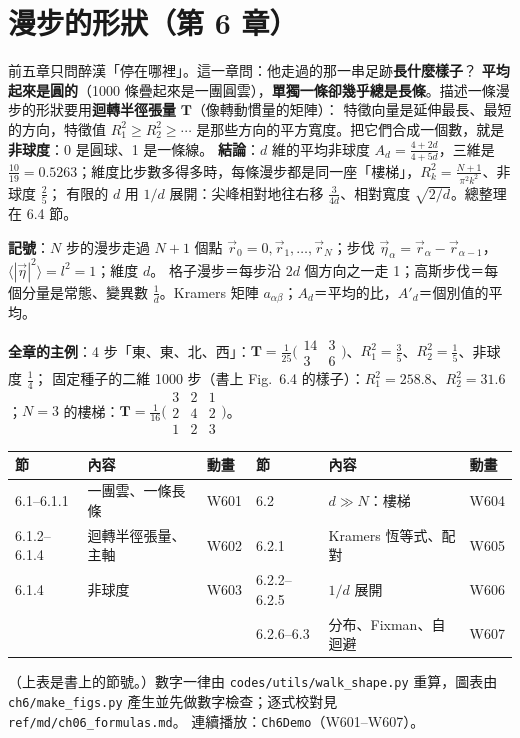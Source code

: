 

\section{漫步的形狀（第 6 章）}

\begin{keybox}[先看這裡]
前五章只問醉漢「停在哪裡」。這一章問：他走過的那一串足跡\textbf{長什麼樣子}？
\textbf{平均起來是圓的}（1000 條疊起來是一團圓雲），\textbf{單獨一條卻幾乎總是長條}。描述一條漫步的形狀要用\textbf{迴轉半徑張量} $\mathbf T$（像轉動慣量的矩陣）：
特徵向量是延伸最長、最短的方向，特徵值 $R_1^2\ge R_2^2\ge\cdots$ 是那些方向的平方寬度。把它們合成一個數，就是\textbf{非球度}：0 是圓球、1 是一條線。
\textbf{結論}：$d$ 維的平均非球度 $A_d=\frac{4+2d}{4+5d}$，三維是 $\frac{10}{19}=0.5263$；維度比步數多得多時，每條漫步都是同一座「樓梯」，$R_k^2=\frac{N+1}{\pi^2k^2}$、非球度 $\frac25$；
有限的 $d$ 用 $1/d$ 展開：尖峰相對地往右移 $\frac{3}{4d}$、相對寬度 $\sqrt{2/d}$。總整理在 6.4 節。

\textbf{記號}：$N$ 步的漫步走過 $N+1$ 個點 $\vec r_0=0,\vec r_1,\dots,\vec r_N$；步伐 $\vec\eta_\alpha=\vec r_\alpha-\vec r_{\alpha-1}$，$\langle|\vec\eta|^2\rangle=l^2=1$；維度 $d$。
格子漫步＝每步沿 $2d$ 個方向之一走 1；高斯步伐＝每個分量是常態、變異數 $\frac1d$。Kramers 矩陣 $a_{\alpha\beta}$；$A_d$＝平均的比，$A'_d$＝個別值的平均。

\textbf{全章的主例}：4 步「東、東、北、西」：$\mathbf T=\frac1{25}\big(\begin{smallmatrix}14&3\\3&6\end{smallmatrix}\big)$、$R_1^2=\frac35$、$R_2^2=\frac15$、非球度 $\frac14$；
固定種子的二維 1000 步（書上 Fig.~6.4 的樣子）：$R_1^2=258.8$、$R_2^2=31.6$；$N=3$ 的樓梯：$\mathbf T=\frac1{16}\big(\begin{smallmatrix}3&2&1\\2&4&2\\1&2&3\end{smallmatrix}\big)$。
\begin{center}
\small
\begin{tabular}{@{}lll@{\qquad}lll@{}}
\toprule
節 & 內容 & 動畫 & 節 & 內容 & 動畫\\
\midrule
6.1--6.1.1 & 一團雲、一條長條 & W601 & 6.2 & $d\gg N$：樓梯 & W604\\
6.1.2--6.1.4 & 迴轉半徑張量、主軸 & W602 & 6.2.1 & Kramers 恆等式、配對 & W605\\
6.1.4 & 非球度 & W603 & 6.2.2--6.2.5 & $1/d$ 展開 & W606\\
 & & & 6.2.6--6.3 & 分布、Fixman、自迴避 & W607\\
\bottomrule
\end{tabular}
\end{center}
（上表是書上的節號。）數字一律由 \texttt{codes/utils/walk\_shape.py} 重算，圖表由 \texttt{ch6/make\_figs.py} 產生並先做數字檢查；逐式校對見 \texttt{ref/md/ch06\_formulas.md}。
連續播放：\texttt{Ch6Demo}（W601--W607）。
\end{keybox}

